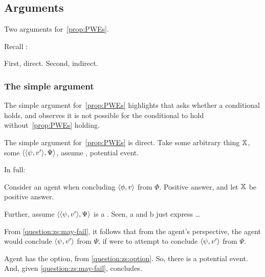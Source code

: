 \subsection{Arguments}
\label{cha:zSpA:sec:arguments}

\begin{note}
  Two arguments for~\autoref{prop:PWEs}.
\end{note}

\begin{note}
  Recall \qzS{}:
  \begin{quote}
    \questionZS*
  \end{quote}
\end{note}

\begin{note}
  First, direct.
  Second, indirect.
\end{note}

\subsubsection{The simple argument}
\label{cha:zSpA:sec:simple-argument}

\begin{note}
  The simple argument for~\autoref{prop:PWEs} highlights that \qzS{} asks whether a conditional holds, and observes it is not possible for the conditional to hold without~\autoref{prop:PWEs} holding.
\end{note}

\begin{note}
  The simple argument for~\autoref{prop:PWEs} is direct.
  Take some arbitrary thing \(\qzSaV{}\), some \(\pvp{\psi}{v'}{\Psi}\), assume \requ{}, potential event.

  In full:

  Consider an agent when concluding \(\pv{\phi}{v}\) from \(\Phi\).
  Positive answer, and let \(\qzSaV{}\) be positive answer.

  Further, assume \(\pvp{\psi}{v'}{\Psi}\) is a \requ{}.
  { \color{red} Seen, a and b just express \requ{}\dots}

  From \qzS{} \ref{question:zs:may-fail}, it follows that from the agent's perspective, the agent would conclude \(\pv{\psi}{v'}\) from \(\Psi\), if \vAgent{} were to attempt to conclude \(\pv{\psi}{v'}\) from \(\Psi\).

  Agent has the option, from \ref{question:zs:option}.
  So, there is a potential event.
  And, given \ref{question:zs:may-fail}, concludes.
\end{note}

